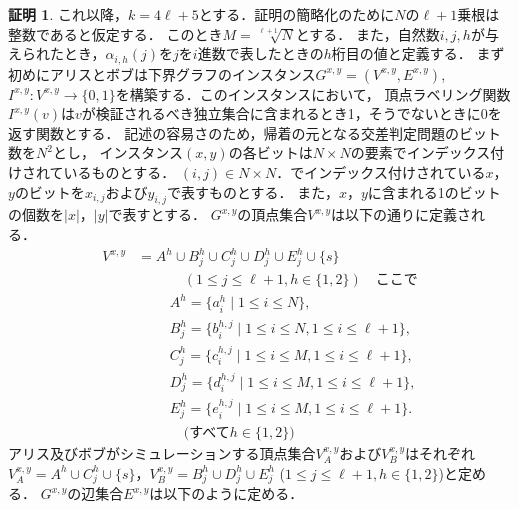 \documentclass[11pt,a4paper]{jarticle}
\theoremstyle{definition}
\newtheorem*{prf*}{証明}
\begin{document}
\begin{prf*}
これ以降，$k = 4\ell +5$とする．証明の簡略化のために$N$の$\ell + 1$乗根は整数であると仮定する．
このとき$M = \sqrt[\ell + 1]{N}$とする．
また，自然数$i, j, h$が与えられたとき，$\alpha_{i, h}(j)$を$j$を$i$進数で表したときの$h$桁目の値と定義する．
まず初めにアリスとボブは下界グラフのインスタンス$G^{x,y} = (V^{x,y}, E^{x,y})$, 
$I^{x,y} : V^{x,y} \to \{0, 1\}$を構築する．このインスタンスにおいて，
頂点ラベリング関数$I^{x,y}(v)$は$v$が検証されるべき独立集合に含まれるとき1，そうでないときに0を返す関数とする．
記述の容易さのため，帰着の元となる交差判定問題のビット数を$N^2$とし，
インスタンス$(x, y)$の各ビットは$N\times N$の要素でインデックス付けされているものとする．
$(i, j) \in N \times N$．でインデックス付けされている$x$，$y$のビットを$x_{i,j}$および$y_{i,j}$で表すものとする．
また，$x$，$y$に含まれる1のビットの個数を$|x|$，$|y|$で表すとする．
$G^{x,y}$の頂点集合$V^{x,y}$は以下の通りに定義される．
\begin{align*}
V^{x,y} &= A^{h} \cup B^{h}_{j} \cup C^{h}_{j} \cup D^{h}_{j} \cup E^{h}_{j} \cup \{s\} \\
&\phantom{=} \quad \quad (1\leq j \leq \ell+1, h \in \{1, 2\}) \quad \text{ここで}\\
&\phantom{=} \quad A^{h} = \{a^{h}_{i} \mid 1\leq i \leq N\}, \\
&\phantom{=} \quad B^{h}_{j} = \{b^{h,j}_{i} \mid 1\leq i \leq N,1\leq i \leq \ell+1\}, \\
&\phantom{=} \quad C^{h}_{j} = \{c^{h,j}_{i} \mid 1\leq i \leq M,1\leq i \leq \ell+1\}, \\
&\phantom{=} \quad D^{h}_{j} = \{d^{h,j}_{i} \mid 1\leq i \leq M,1\leq i \leq \ell+1\}, \\
&\phantom{=} \quad E^{h}_{j} = \{e^{h,j}_{i} \mid 1\leq i \leq M,1\leq i \leq \ell+1\}. \\
&\phantom{=} \quad \quad \text{(すべて$h \in \{1, 2\}$)}
\end{align*}
アリス及びボブがシミュレーションする頂点集合$V^{x,y}_{A}$および$V^{x,y}_{B}$はそれぞれ
$V^{x,y}_{A} = A^{h} \cup C^{h}_{j} \cup \{s\}$，$V^{x,y}_{B} = B^{h}_{j} \cup D^{h}_{j} \cup E^{h}_{j}$
($1\leq j \leq \ell+1, h \in \{1, 2\}$)と定める．
$G^{x,y}$の辺集合$E^{x,y}$は以下のように定める．


\end{prf*}
\end{document}
